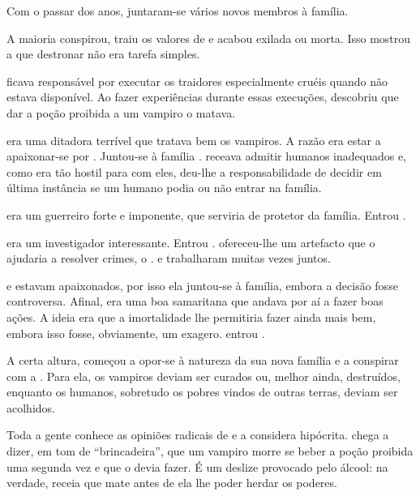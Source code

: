 Com o passar dos anos, juntaram-se vários novos membros à família.

A maioria conspirou, traiu os valores de  e acabou exilada ou morta. Isso mostrou a  que destronar  não era tarefa simples.

 ficava responsável por executar os traidores especialmente cruéis quando  não estava disponível. Ao fazer experiências durante essas execuções, descobriu que dar a poção proibida a um vampiro o matava.

 era uma ditadora terrível que tratava bem os vampiros. A razão era estar a apaixonar-se por . Juntou-se à família .  receava admitir humanos inadequados e, como  era tão hostil para com eles, deu-lhe a responsabilidade de decidir em última instância se um humano podia ou não entrar na família.

 era um guerreiro forte e imponente, que serviria de protetor da família. Entrou .

 era um investigador interessante. Entrou .  ofereceu-lhe um artefacto que o ajudaria a resolver crimes, o .  e  trabalharam muitas vezes juntos.

 e  estavam apaixonados, por isso ela juntou-se à família, embora a decisão fosse controversa. Afinal, era uma boa samaritana que andava por aí a fazer boas ações. A ideia era que a imortalidade lhe permitiria fazer ainda mais bem, embora isso fosse, obviamente, um exagero.  entrou .

A certa altura,  começou a opor-se à natureza da sua nova família e a conspirar com a . Para ela, os vampiros deviam ser curados ou, melhor ainda, destruídos, enquanto os humanos, sobretudo os pobres vindos de outras terras, deviam ser acolhidos.

Toda a gente conhece as opiniões radicais de  e a considera hipócrita.  chega a dizer, em tom de ``brincadeira'', que um vampiro morre se beber a poção proibida uma segunda vez e que  o devia fazer. É um deslize provocado pelo álcool: na verdade,  receia que  mate  antes de ela lhe poder herdar os poderes.

